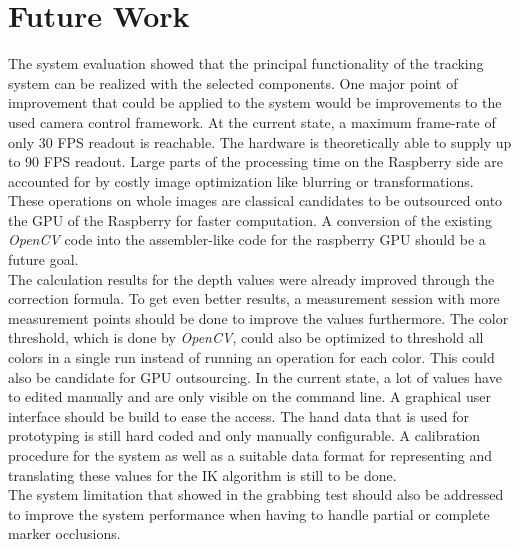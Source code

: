 \chapter{Future Work}
The system evaluation showed that the principal functionality of the tracking system can be realized with the selected components. One major point of improvement that could be applied to the system would be improvements to the used camera control framework. At the current state, a maximum frame-rate of only 30 FPS readout is reachable.  The hardware is theoretically able to supply up to 90 FPS readout. 
Large parts of the processing time on the Raspberry side are accounted for by costly image optimization like blurring or transformations. These operations on whole images are classical candidates to be outsourced onto the GPU of the Raspberry for faster computation. A conversion of the existing \textit{OpenCV} code into the assembler-like code for the raspberry GPU should be a future goal.\\
The calculation results for the depth values were already improved through the correction formula. To get even better results, a measurement session with more measurement points should be done to improve the values furthermore.
The color threshold, which is done by \textit{OpenCV}, could also be optimized to threshold all colors in a single run instead of running an operation for each color. This could also be candidate for GPU outsourcing.
In the current state, a lot of values have to edited manually and are only visible on the command line. A graphical user interface should be build to ease the access.
The hand data that is used for prototyping is still hard coded and only manually configurable. A calibration procedure for the system as well as a suitable data format for representing and translating these values for the IK algorithm is still to be done. 
\\The system limitation that showed in the grabbing test should also be addressed to improve the system performance when having to handle partial or complete marker occlusions.
